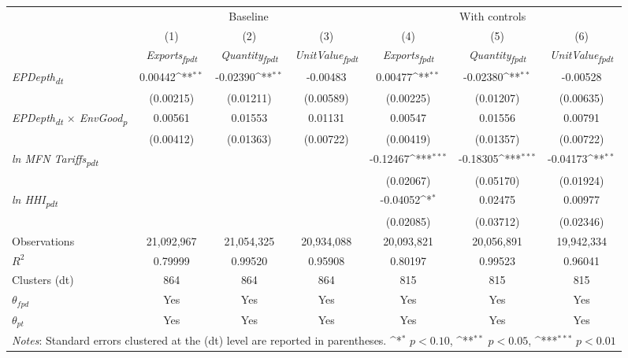 {
\def\sym#1{\ifmmode^{#1}\else\(^{#1}\)\fi}
\begin{tabular}{l*{6}{c}}
\toprule
&\multicolumn{3}{c}{Baseline}&\multicolumn{3}{c}{With controls}\\\cmidrule(lr){2-4}\cmidrule(lr){5-7}
&(1)&(2)&(3)&(4)&(5)&(6)\\
&\textit{Exports\textsubscript{fpdt}}&\textit{Quantity\textsubscript{fpdt}}&\textit{UnitValue\textsubscript{fpdt}}&\textit{Exports\textsubscript{fpdt}}&\textit{Quantity\textsubscript{fpdt}}&\textit{UnitValue\textsubscript{fpdt}}\\
\midrule
\textit{EPDepth\textsubscript{dt}} & 0.00442\sym{**} & -0.02390\sym{**} & -0.00483 & 0.00477\sym{**} & -0.02380\sym{**} & -0.00528\\
 & (0.00215) & (0.01211) & (0.00589) & (0.00225) & (0.01207) & (0.00635)\\
\addlinespace
\textit{EPDepth\textsubscript{dt} $\times$ EnvGood\textsubscript{p}} & 0.00561 & 0.01553 & 0.01131 & 0.00547 & 0.01556 & 0.00791\\
 & (0.00412) & (0.01363) & (0.00722) & (0.00419) & (0.01357) & (0.00722)\\
\addlinespace
\textit{ln MFN Tariffs\textsubscript{pdt}} &  &  &  & -0.12467\sym{***} & -0.18305\sym{***} & -0.04173\sym{**}\\
 &  &  &  & (0.02067) & (0.05170) & (0.01924)\\
\addlinespace
\textit{ln HHI\textsubscript{pdt}} &  &  &  & -0.04052\sym{*} & 0.02475 & 0.00977\\
 &  &  &  & (0.02085) & (0.03712) & (0.02346)\\
\midrule
Observations & 21,092,967 & 21,054,325 & 20,934,088 & 20,093,821 & 20,056,891 & 19,942,334\\
$R^{2}$ & 0.79999 & 0.99520 & 0.95908 & 0.80197 & 0.99523 & 0.96041\\
Clusters (dt) & 864 & 864 & 864 & 815 & 815 & 815\\
$\theta_{fpd}$ & Yes & Yes & Yes & Yes & Yes & Yes\\
$\theta_{pt}$ & Yes & Yes & Yes & Yes & Yes & Yes\\
\bottomrule
\multicolumn{7}{l}{\footnotesize \textit{Notes}: Standard errors clustered at the (dt) level are reported in parentheses. \sym{*} \(p<0.10\), \sym{**} \(p<0.05\), \sym{***} \(p<0.01\)}\\
\end{tabular}
}
